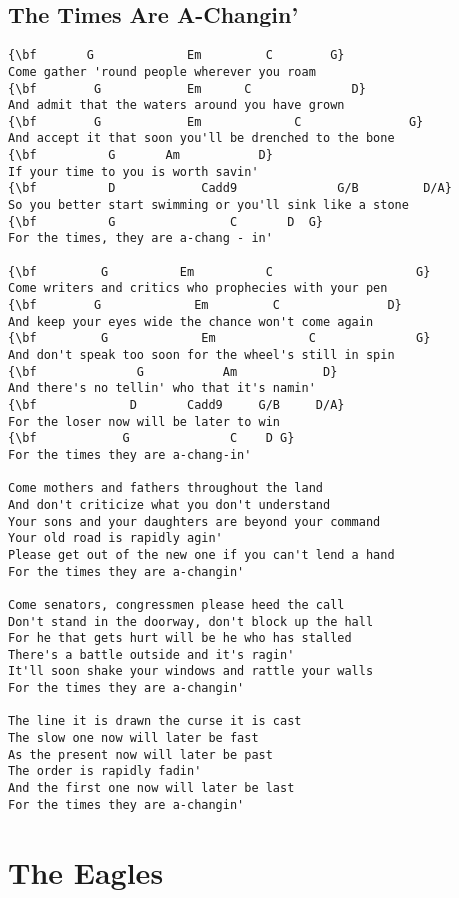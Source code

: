 \documentclass[a4paper]{article}
\begin{document}
\subsection{The Times Are A-Changin'}
\begin{Verbatim}[commandchars=\\\{\}]
{\bf       G             Em         C        G}
Come gather 'round people wherever you roam
{\bf        G            Em      C              D}
And admit that the waters around you have grown
{\bf        G            Em             C               G}
And accept it that soon you'll be drenched to the bone
{\bf          G       Am           D}
If your time to you is worth savin'
{\bf          D            Cadd9              G/B         D/A}
So you better start swimming or you'll sink like a stone
{\bf          G                C       D  G}
For the times, they are a-chang - in'

{\bf         G          Em          C                    G}
Come writers and critics who prophecies with your pen
{\bf        G             Em         C               D}
And keep your eyes wide the chance won't come again
{\bf         G             Em             C              G}
And don't speak too soon for the wheel's still in spin
{\bf              G           Am            D}
And there's no tellin' who that it's namin'
{\bf             D       Cadd9     G/B     D/A}
For the loser now will be later to win
{\bf            G              C    D G}
For the times they are a-chang-in'

Come mothers and fathers throughout the land
And don't criticize what you don't understand
Your sons and your daughters are beyond your command
Your old road is rapidly agin'
Please get out of the new one if you can't lend a hand
For the times they are a-changin'

Come senators, congressmen please heed the call
Don't stand in the doorway, don't block up the hall
For he that gets hurt will be he who has stalled
There's a battle outside and it's ragin'
It'll soon shake your windows and rattle your walls
For the times they are a-changin'

The line it is drawn the curse it is cast
The slow one now will later be fast
As the present now will later be past
The order is rapidly fadin'
And the first one now will later be last
For the times they are a-changin'

\end{Verbatim}
\newpage
\section{The Eagles}
\end{document}
